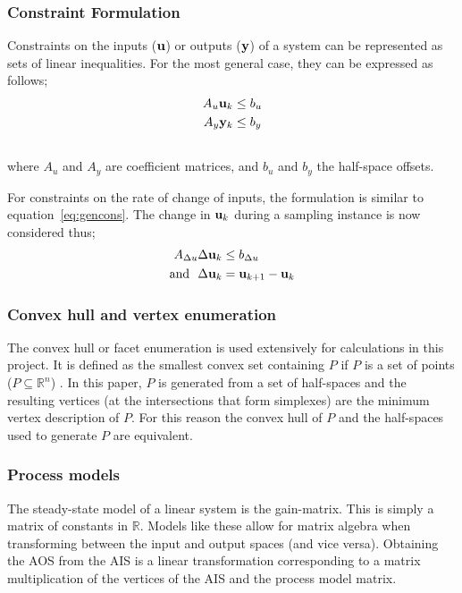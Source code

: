 \documentclass[final,authoryear,5pt,times,twocolumn]{elsarticle}
\newcommand{\vect}[1] %
{{\bf {#1}}}
\begin{document}
\subsubsection{Constraint Formulation}
Constraints on the inputs ($\vect{u}$) or outputs ($\vect{y}$) of a system can be represented as sets of linear inequalities.
For the most general case, they can be expressed as follows;
\begin{align}
  \label{eq:gencons}
  A_u\vect{u}_k &\leq b_u \\ \notag
  A_y\vect{y}_k &\leq b_y \\ \notag
\end{align}
where $A_u$ and $A_y$ are coefficient matrices, and $b_u$ and $b_y$  the half-space offsets.

For constraints on the rate of change of inputs, the formulation is similar to equation~\ref{eq:gencons}.
The change in $\vect{u}_k$ during a sampling instance is now considered thus;
\begin{align*}
  A_{\Delta u}\Delta \vect{u}_k &\leq b_{\Delta u} \notag \\
  \text{and}~~ \Delta \vect{u}_k &= \vect{u}_{k+1}-\vect{u}_k
\end{align*}

\subsubsection{Convex hull and vertex enumeration}
The convex hull or facet enumeration is used extensively for calculations in this project.
It is defined as the smallest convex set containing $P$ if $P$ is a set of points ($P \subseteq \mathbb{R}^n$) \citep[74]{wenger}.
In this paper, $P$ is generated from a set of half-spaces and the resulting vertices (at the intersections that form simplexes) are the minimum vertex description of $P$.
For this reason the convex hull of $P$ and the half-spaces used to generate $P$ are equivalent.

\subsubsection{Process models}
The steady-state model of a linear system is the gain-matrix.
This is simply a matrix of constants in $\mathbb{R}$.
Models like these allow for matrix algebra when transforming between the input and output spaces (and vice versa).
Obtaining the AOS from the AIS is a linear transformation corresponding to a matrix multiplication of the vertices of the AIS and the process model matrix.
\end{document}
